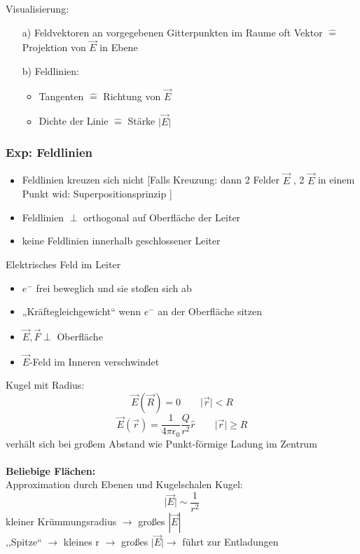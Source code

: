 \documentclass[titlepage,12pt,a4paper,ngerman]{report}
\begin{document}
Visualisierung:
\begin{itemize}
\item[a)] Feldvektoren an vorgegebenen Gitterpunkten im Raume oft Vektor $\widehat{=}$ Projektion von $\vec{E}$ in Ebene
\item[b)] Feldlinien: 
\begin{itemize}
\item Tangenten $\widehat{=}$ Richtung von $\vec{E}$
\item Dichte der Linie $\widehat{=}$ Stärke $\vert \vec{E} \vert$
\end{itemize}
\end{itemize}

\subsubsection*{Exp: Feldlinien} %
\begin{itemize}
\item Feldlinien kreuzen sich nicht [Falls Kreuzung: dann 2 Felder $\vec{E}$ , 2 $\vec{E}$ in einem Punkt wid: Superpositionsprinzip ]
\item Feldlinien $\perp$ orthogonal auf Oberfläche der Leiter
\item keine Feldlinien innerhalb geschlossener Leiter
\end{itemize}
Elektrisches Feld im Leiter
\begin{itemize}
\item $e^-$ frei beweglich und sie stoßen sich ab
\item „Kräftegleichgewicht“ wenn $e^-$ an der Oberfläche sitzen
\item $\vec{E}, \vec{F} \perp$ Oberfläche
\item $\vec{E}$-Feld im Inneren verschwindet
\end{itemize}
Kugel mit Radius: $$ \vec{E}(\vec{R}) = 0 \qquad \vert \vec{r} \vert < R$$
$$ \vec{E}(\vec{r}) = \frac{1}{4 \pi\epsilon_0} \frac{Q}{r^2} \hat{r} \qquad \vert \vec{r} \vert \ge R$$
verhält sich bei großem Abstand wie Punkt-förmige Ladung im Zentrum\\\\
\textbf{Beliebige Flächen:}\\
Approximation durch Ebenen und Kugelschalen
Kugel:
$$ \vert \vec{E} \vert \sim \frac{1}{r^2} $$
kleiner Krümmungsradius $\rightarrow$ großes $ | \vec{E} | $\\
,,Spitze`` $\rightarrow$ kleines r $\rightarrow$ großes $\vert \vec{E} \vert \rightarrow$ führt zur Entladungen\\\\
\end{document}
